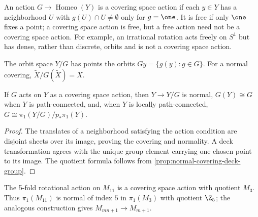 \begin{definition}
\label{def:group-action}

An action $G\to\operatorname{Homeo}(Y)$ is a covering space action if each
$y\in Y$ has a neighborhood $U$ with $g(U)\cap U\neq\emptyset$ only for
$g=\one$. It is free if only $\one$ fixes a point; a covering space action is
free, but a free action need not be a covering space action. For example, an
irrational rotation acts freely on $S^1$ but has dense, rather than discrete,
orbits and is not a covering space action.
\end{definition}

\begin{definition}
\label{def:orbit-space}


The orbit space $Y/G$ has points the orbits $Gy=\{g(y):g\in G\}$. For a
normal covering, $\widetilde X/G(\widetilde X)=X$.
\end{definition}

\begin{proposition}
\label{prop:covering-space-action-quotient}


If $G$ acts on $Y$ as a covering space action, then $Y\to Y/G$ is normal,
$G(Y)\cong G$ when $Y$ is path-connected, and, when $Y$ is locally
path-connected, $G\cong\pi_1(Y/G)/p_*\pi_1(Y)$.
\end{proposition}

\begin{proof}
\sketch The translates of a neighborhood satisfying the action condition are
disjoint sheets over its image, proving the covering and normality. A deck
transformation agrees with the unique group element carrying one chosen point
to its image. The quotient formula follows from
\cref{prop:normal-covering-deck-group}.
\end{proof}

\begin{example}
\label{ex:genus-11-torus-covering}

The 5-fold rotational action on $M_{11}$ is a covering space action with
quotient $M_3$. Thus $\pi_1(M_{11})$ is normal of index $5$ in $\pi_1(M_3)$
with quotient $\Z_5$; the analogous construction gives $M_{mn+1}\to M_{m+1}$.
\end{example}


